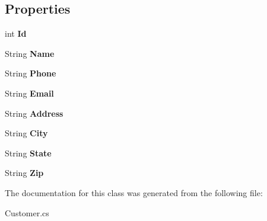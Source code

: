 \subsection*{Properties}
\begin{DoxyCompactItemize}
\item 
\mbox{\label{class_nexus_1_1_customer_a92b4bb009d99ed2838d899b1487f2ee2}} 
int {\bfseries Id}
\item 
\mbox{\label{class_nexus_1_1_customer_a6687c07f1e86593ddb5c5afefb0ce86b}} 
String {\bfseries Name}
\item 
\mbox{\label{class_nexus_1_1_customer_a042f6091e2beba96e6325de37d628e36}} 
String {\bfseries Phone}
\item 
\mbox{\label{class_nexus_1_1_customer_a89eddb08eba859e61ea104000072dffa}} 
String {\bfseries Email}
\item 
\mbox{\label{class_nexus_1_1_customer_a58ba8e29bf739b9ea62698a16f96b3ee}} 
String {\bfseries Address}
\item 
\mbox{\label{class_nexus_1_1_customer_a3efe54a144b679812927cf290c8837ba}} 
String {\bfseries City}
\item 
\mbox{\label{class_nexus_1_1_customer_a8e3beb50d0bf5b6f1e84cdaff0b426ac}} 
String {\bfseries State}
\item 
\mbox{\label{class_nexus_1_1_customer_a483fe86320428e3a61dad6562541a571}} 
String {\bfseries Zip}
\end{DoxyCompactItemize}


The documentation for this class was generated from the following file\+:\begin{DoxyCompactItemize}
\item 
Customer.\+cs\end{DoxyCompactItemize}
